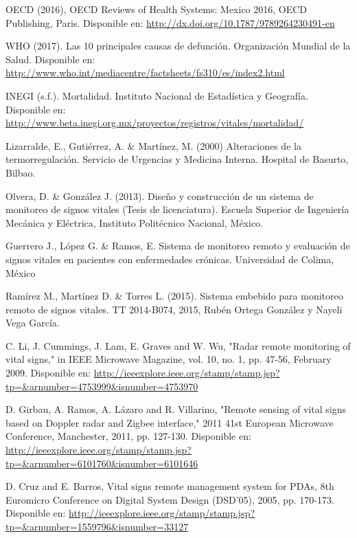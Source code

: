 \begin{thebibliography}{0}
	\setlength{\parsep}{0cm}\setlength{\itemsep}{0cm}\setlength{\topsep}{0cm}
	
	 OECD (2016), OECD Reviews of Health Systems: Mexico 2016, OECD Publishing, Paris. Disponible en: \url{http://dx.doi.org/10.1787/9789264230491-en}

	 WHO (2017). Las 10 principales causas de defunción. Organización Mundial de la Salud. Disponible en:  \url{http://www.who.int/mediacentre/factsheets/fs310/es/index2.html}
	
	 INEGI (s.f.). Mortalidad. Instituto Nacional de Estadística y Geografía. Disponible en: \url{http://www.beta.inegi.org.mx/proyectos/registros/vitales/mortalidad/}
	
	 Lizarralde, E., Gutiérrez, A. \& Martínez, M. (2000) Alteraciones de la termorregulación. Servicio de Urgencias y Medicina Interna. Hospital de Basurto, Bilbao.

	 Olvera, D. \& González J. (2013). Diseño y construcción de un sistema de monitoreo de signos vitales (Tesis de licenciatura). Escuela Superior de Ingeniería Mecánica y Eléctrica, Instituto Politécnico Nacional, México.
	
	 Guerrero J., López G. \& Ramos, E. Sistema de monitoreo remoto y evaluación de signos vitales en pacientes con enfermedades crónicas. Universidad de Colima, México
	
	 Ramírez M., Martínez D. \& Torres L. (2015). Sistema embebido para monitoreo remoto de signos vitales. TT 2014-B074, 2015, Rubén Ortega González y  Nayeli Vega García.
	
	 C. Li, J. Cummings, J. Lam, E. Graves and W. Wu, "Radar remote monitoring of vital signs," in IEEE Microwave Magazine, vol. 10, no. 1, pp. 47-56, February 2009. Disponible en: \url{http://ieeexplore.ieee.org/stamp/stamp.jsp?tp=\&arnumber=4753999\&isnumber=4753970}
	
	 D. Girbau, A. Ramos, A. Lázaro and R. Villarino, "Remote sensing of vital signs based on Doppler radar and Zigbee interface," 2011 41st European Microwave Conference, Manchester, 2011, pp. 127-130. Disponible en: \url{http://ieeexplore.ieee.org/stamp/stamp.jsp?tp=\&arnumber=6101760\&isnumber=6101646}
	
	 D. Cruz and E. Barros, Vital signs remote management system for PDAs, 8th Euromicro Conference on Digital System Design (DSD'05), 2005, pp. 170-173. Disponible en: \url{http://ieeexplore.ieee.org/stamp/stamp.jsp?tp=\&arnumber=1559796\&isnumber=33127}
	

\end{thebibliography}
